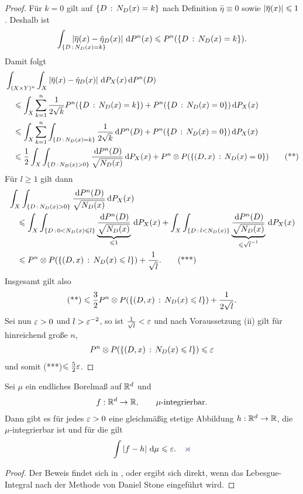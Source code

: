 \begin{proof}
Für $k=0$ gilt auf $\left\{ D\,:\,N_D(x)=k\right\}$ nach Definition $\hat{\eta}\equiv0$
sowie $\left|{\overline{\eta}}(x)\right|\leqslant 1$. Deshalb ist
\begin{align*}
\int_{\setdef{D}{N_D(x)=k}}
\!\!\!\!\!\!\!\!\!\!\!\!\!\!\!\!\!\!\!\!\!\!\!\!\!\!
\abs{\bar{\eta}(x)-\hat{\eta}_D(x)}\dP^n(x) \le P^n(\setdef{D}{N_D(x)=k}).
\end{align*} 
Damit folgt
\begin{align*}
&\int_{(X\times Y)^n} \int_X
\left|{\overline{\eta}}(x)-\hat{\eta}_D(x)\right|\,\mathrm{d} P_X(x)\,\mathrm{d} P^n(D)\\
&\quad\leqslant
\int_X \sum_{k=1}^n \frac{1}{2\sqrt{k}} P^n(\left\{ D\,:\,N_D(x)=k\right\})
+ P^n(\left\{ D\,:\,N_D(x)=0\right\})\,\mathrm{d} P_X(x)\\
&\quad\leqslant
\int_X \sum_{k=1}^n \int_{\left\{ D\,:\,N_D(x)=k\right\}}
\frac{1}{2\sqrt{k}} \,\mathrm{d} P^n(D) + P^n(\left\{ D\,:\,N_D(x)=0\right\})\,\mathrm{d} P_X(x)\\
&\quad\leqslant
\frac{1}{2}\int_X \int_{\left\{ D\,:\,N_D(x)>0\right\}}
\frac{\,\mathrm{d} P^n(D)}{\sqrt{N_D(x)}}\,\mathrm{d} P_X(x)  +
P^n\otimes P(\left\{ (D,x)\,:\,N_D(x)=0\right\})\tag{**}
\end{align*}
Für $l\ge 1$ gilt dann
\begin{align*}
&\int_X  \int_{\left\{ D\,:\,N_D(x)>0\right\}}
\frac{\,\mathrm{d} P^n(D)}{\sqrt{N_D(x)}}\,\mathrm{d} P_X(x)\\
&\quad \leqslant
\int_X  \int_{\left\{ D\,:\,0<N_D(x)\leqslant l\right\}}
\underbrace{\frac{\,\mathrm{d} P^n(D)}{\sqrt{N_D(x)}}}_{\leqslant1}\,\mathrm{d} P_X(x)
+
\int_X  \int_{\left\{ D\,:\,l<N_D(x)\right\}}
\underbrace{\frac{\,\mathrm{d} P^n(D)}{\sqrt{N_D(x)}}}_{\leqslant \sqrt{l}^{-1}}\,\mathrm{d} P_X(x)\\
&\quad \leqslant
P^n\otimes P(\left\{ (D,x)\,:\,N_D(x)\leqslant l\right\}) + \frac{1}{\sqrt{l}}.\tag{***}
\end{align*}
Insgesamt gilt also
\begin{align*}
\text{(**)} \leqslant \frac{3}{2}P^n\otimes P(\left\{ (D,x)\,:\,N_D(x)\leqslant l\right\}) +
\frac{1}{2\sqrt{l}}.
\end{align*}
Sei nun $\varepsilon >0$ und $l> \varepsilon^{-2}$, so ist $\frac{1}{\sqrt{l}} < \varepsilon$ und nach
Voraussetzung (ii) gilt für hinreichend große $n$,
\begin{align*}
P^n\otimes P(\left\{ (D,x)\,:\,N_D(x)\leqslant l\right\}) \leqslant \varepsilon
\end{align*}
und somit (***)$\leqslant \frac{5}{2}\varepsilon$.\qedhere
\end{proof}

\begin{prop}
\label{prop:1.3.5}
Sei $\mu$ ein endliches Borelmaß auf $\mathbb{R}^d$ und
\begin{align*}
f: \mathbb{R}^d\to \mathbb{R},\qquad \mu\text{-integrierbar}.
\end{align*}
Dann gibt es für jedes $\varepsilon > 0$ eine gleichmäßig stetige Abbildung $h:\mathbb{R}^d\to
\mathbb{R}$, die $\mu$-integrierbar ist und für die gilt
\begin{align*}
\int \abs{f-h}\dmu \le \ep.\fishhere
\end{align*}
\end{prop}
\begin{proof}
Der Beweis findet sich in \cite{bauerI}, oder ergibt sich direkt, wenn das
Lebesgue-Integral nach der Methode von Daniel Stone eingeführt wird.\qedhere
\end{proof}

